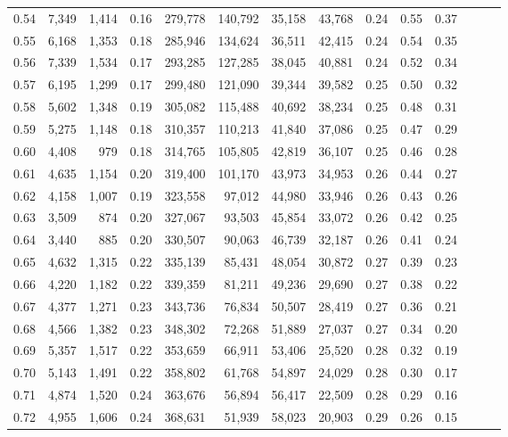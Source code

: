 \begin{tabular}{rrrrrrrrrrrrrr}
0.54 &  7,349 &  1,414 &  0.16 &  279,778 &  140,792 &  35,158 &  43,768 &  0.24 &  0.55 &      0.37 \\
0.55 &  6,168 &  1,353 &  0.18 &  285,946 &  134,624 &  36,511 &  42,415 &  0.24 &  0.54 &      0.35 \\
0.56 &  7,339 &  1,534 &  0.17 &  293,285 &  127,285 &  38,045 &  40,881 &  0.24 &  0.52 &      0.34 \\
0.57 &  6,195 &  1,299 &  0.17 &  299,480 &  121,090 &  39,344 &  39,582 &  0.25 &  0.50 &      0.32 \\
0.58 &  5,602 &  1,348 &  0.19 &  305,082 &  115,488 &  40,692 &  38,234 &  0.25 &  0.48 &      0.31 \\
0.59 &  5,275 &  1,148 &  0.18 &  310,357 &  110,213 &  41,840 &  37,086 &  0.25 &  0.47 &      0.29 \\
0.60 &  4,408 &    979 &  0.18 &  314,765 &  105,805 &  42,819 &  36,107 &  0.25 &  0.46 &      0.28 \\
0.61 &  4,635 &  1,154 &  0.20 &  319,400 &  101,170 &  43,973 &  34,953 &  0.26 &  0.44 &      0.27 \\
0.62 &  4,158 &  1,007 &  0.19 &  323,558 &   97,012 &  44,980 &  33,946 &  0.26 &  0.43 &      0.26 \\
0.63 &  3,509 &    874 &  0.20 &  327,067 &   93,503 &  45,854 &  33,072 &  0.26 &  0.42 &      0.25 \\
0.64 &  3,440 &    885 &  0.20 &  330,507 &   90,063 &  46,739 &  32,187 &  0.26 &  0.41 &      0.24 \\
0.65 &  4,632 &  1,315 &  0.22 &  335,139 &   85,431 &  48,054 &  30,872 &  0.27 &  0.39 &      0.23 \\
0.66 &  4,220 &  1,182 &  0.22 &  339,359 &   81,211 &  49,236 &  29,690 &  0.27 &  0.38 &      0.22 \\
0.67 &  4,377 &  1,271 &  0.23 &  343,736 &   76,834 &  50,507 &  28,419 &  0.27 &  0.36 &      0.21 \\
0.68 &  4,566 &  1,382 &  0.23 &  348,302 &   72,268 &  51,889 &  27,037 &  0.27 &  0.34 &      0.20 \\
0.69 &  5,357 &  1,517 &  0.22 &  353,659 &   66,911 &  53,406 &  25,520 &  0.28 &  0.32 &      0.19 \\
0.70 &  5,143 &  1,491 &  0.22 &  358,802 &   61,768 &  54,897 &  24,029 &  0.28 &  0.30 &      0.17 \\
0.71 &  4,874 &  1,520 &  0.24 &  363,676 &   56,894 &  56,417 &  22,509 &  0.28 &  0.29 &      0.16 \\
0.72 &  4,955 &  1,606 &  0.24 &  368,631 &   51,939 &  58,023 &  20,903 &  0.29 &  0.26 &      0.15 \\

\end{tabular}
